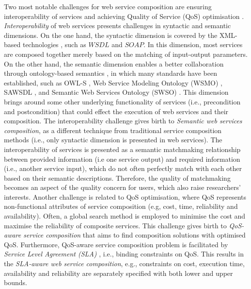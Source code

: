 Two most notable challenges for web service composition are ensuring interoperability of services and achieving Quality of Service (QoS) optimisation \cite{fensel2011semantic}. \emph{Interoperability} of web services presents challenges in syntactic and semantic dimensions. On the one hand, the syntactic dimension is covered by the XML-based technologies \cite{yu2008deploying}, such as $WSDL$ and $SOAP$. In this dimension, most services are composed together merely based on the matching of input-output parameters. On the other hand, the semantic dimension enables a better collaboration through ontology-based semantics \cite{o2005review}, in which many standards have been established, such as OWL-S \cite{martin2004owl}, Web Service Modeling Ontology (WSMO) \cite{lausen2005w3c}, SAWSDL \cite{kopecky2007sawsdl}, and Semantic Web Services Ontology (SWSO) \cite{petrie2016web}. This dimension brings around some other underlying functionality of services (i.e., precondition and postcondition) that could effect the execution of web services and their composition. The interoperability challenge gives birth to \emph{Semantic web services composition}, as a different technique from traditional service composition methods (i.e., only syntactic dimension is presented in web services). The interoperability of services is presented as a semantic matchmaking relationship between provided information (i.e one service output) and required information (i.e., another service input), which do not often perfectly match with each other based on their semantic descriptions. Therefore, the quality of matchmaking becomes an aspect of the quality concern for users, which also raise researchers' interests. Another challenge is related to QoS optimisation, where QoS represents non-functional attributes of service composition (e.g, cost, time, reliability and availability). Often, a global search method is employed to minimise the cost and maximise the reliability of composite services. This challenge gives birth to \emph{QoS-aware service composition} that aims to find composition solutions with optimised QoS. Furthermore, QoS-aware service composition problem is facilitated by \emph{Service Level Agreement (SLA)} \cite{sahai2002automated}, i.e., binding constraints on QoS. This results in the \emph{SLA-aware web service composition}, e.g., constraints on cost, execution time, availability and reliability are separately specified with both lower and upper bounds.

